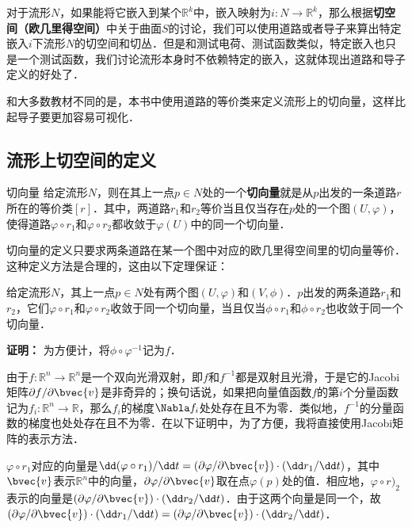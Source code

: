 
对于流形$N$，如果能将它嵌入到某个$\mathbb{R}^k$中，嵌入映射为$i:N\rightarrow\mathbb{R}^k$，那么根据\textbf{切空间（欧几里得空间）}中关于曲面$S$的讨论，我们可以使用道路或者导子来算出特定嵌入$i$下流形$N$的切空间和切丛．但是和测试电荷、测试函数类似，特定嵌入也只是一个测试函数，我们讨论流形本身时不依赖特定的嵌入，这就体现出道路和导子定义的好处了．

和大多数教材不同的是，本书中使用道路的等价类来定义流形上的切向量，这样比起导子要更加容易可视化．

\subsection{流形上切空间的定义}

\begin{definition}{切向量}
给定流形$N$，则在其上一点$p\in N$处的一个\textbf{切向量}就是从$p$出发的一条道路$r$所在的等价类$[r]$．其中，两道路$r_1$和$r_2$等价当且仅当存在$p$处的一个图$(U, \varphi)$，使得道路$\varphi\circ r_1$和$\varphi\circ r_2$都收敛于$\varphi(U)$中的同一个切向量．
\end{definition}

切向量的定义只要求两条道路在某一个图中对应的欧几里得空间里的切向量等价．这种定义方法是合理的，这由以下定理保证：

\begin{theorem}{}\label{tgSpa_the1}
给定流形$N$，其上一点$p\in N$处有两个图$(U, \varphi)$和$(V, \phi)$．$p$出发的两条道路$r_1$和$r_2$，它们$\varphi\circ r_1$和$\varphi\circ r_2$收敛于同一个切向量，当且仅当$\phi\circ r_1$和$\phi\circ r_2$也收敛于同一个切向量．
\end{theorem}

\textbf{证明：}
为方便计，将$\phi\circ\varphi^{-1}$记为$f$．

由于$f:\mathbb{R}^n\rightarrow\mathbb{R}^n$是一个双向光滑双射，即$f$和$f^{-1}$都是双射且光滑，于是它的Jacobi矩阵$\partial f/\partial \bvec{v}$是非奇异的；换句话说，如果把向量值函数$f$的第$i$个分量函数记为$f_i:\mathbb{R}^n\rightarrow\mathbb{R}$，那么$f_i$的梯度$\Nabla f_i$处处存在且不为零．类似地，$f^{-1}$的分量函数的梯度也处处存在且不为零．在以下证明中，为了方便，我将直接使用Jacobi矩阵的表示方法．

$\varphi\circ r_1$对应的向量是$\dd(\varphi\circ r_1)/\dd t=(\partial\varphi/\partial\bvec{v})\cdot(\dd r_1/\dd t)$，其中$\bvec{v}$表示$\mathbb{R}^n$中的向量，$\partial\varphi/\partial\bvec{v}$取在点$\varphi(p)$处的值．相应地，$\varphi\circ r)_2$表示的向量是$(\partial\varphi/\partial\bvec{v})\cdot(\dd r_2/\dd t)$．由于这两个向量是同一个，故$(\partial\varphi/\partial\bvec{v})\cdot(\dd r_1/\dd t)=(\partial\varphi/\partial\bvec{v})\cdot(\dd r_2/\dd t)$．

